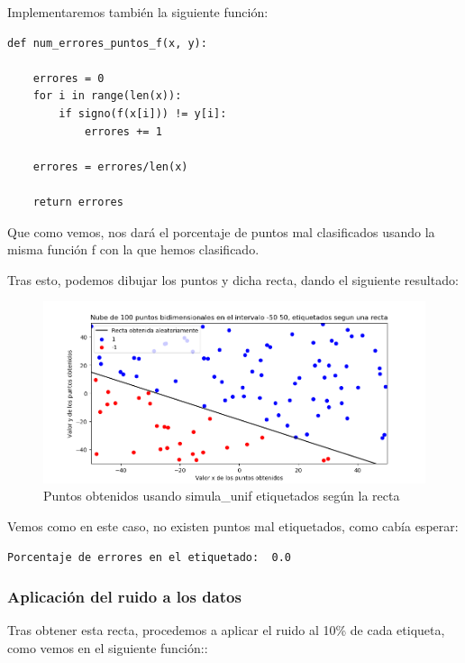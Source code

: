 \documentclass[12pt, spanish]{article}
\begin{document}
Implementaremos también la siguiente función:

\begin{lstlisting}
def num_errores_puntos_f(x, y):

	errores = 0
	for i in range(len(x)):
		if signo(f(x[i])) != y[i]:
			errores += 1

	errores = errores/len(x)

	return errores
\end{lstlisting}

Que como vemos, nos dará el porcentaje de puntos mal clasificados usando la misma función f con la que hemos clasificado.


Tras esto, podemos dibujar los puntos y dicha recta, dando el siguiente resultado:

\begin{figure}[H]
  \centering
      \includegraphics[scale = 0.70]{ej1-2-1.png}
 		 \caption{Puntos obtenidos usando simula\_unif etiquetados según la recta}
  		\label{fig:ej1-2-1}

\end{figure}


Vemos como en este caso, no existen puntos mal etiquetados, como cabía esperar:

\begin{lstlisting}
Porcentaje de errores en el etiquetado:  0.0
\end{lstlisting}

\newpage

\subsubsection{Aplicación del ruido a los datos}

Tras obtener esta recta, procedemos a aplicar el ruido al 10\% de cada etiqueta, como vemos en el siguiente función::
\end{document}
